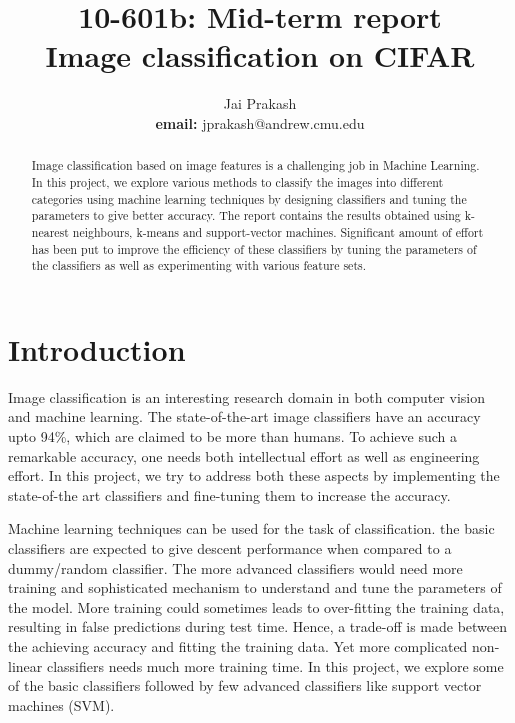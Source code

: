 \documentclass{article} %
\author{Jai Prakash \\ \textbf{email:} jprakash@andrew.cmu.edu}
\title{10-601b: Mid-term report\\Image classification on CIFAR
}
\begin{document}
\maketitle

\begin{abstract}
Image classification based on image features is a challenging job in Machine Learning. In this project, we explore various methods to classify the images into different categories using machine learning techniques by designing classifiers and tuning the parameters to give better accuracy. The report contains the results obtained using k-nearest neighbours, k-means and support-vector machines. Significant amount of effort has been put to improve the efficiency of these classifiers by tuning the parameters of the classifiers as well as experimenting with various feature sets. %
\end{abstract}

\section{Introduction}
Image classification is an interesting research domain in both computer vision and machine learning. The state-of-the-art image classifiers have an accuracy upto 94\%, which are claimed to be more than humans. To achieve such a remarkable accuracy, one needs both intellectual effort as well as engineering effort. In this project, we try to address both these aspects by implementing the state-of-the art classifiers and fine-tuning them to increase the accuracy.

Machine learning techniques can be used for the task of classification. the basic classifiers are expected to give descent performance when compared to a dummy/random classifier. The more advanced classifiers would need more training and sophisticated mechanism to understand and tune the parameters of the model. More training could sometimes leads to over-fitting the training data, resulting in false predictions during test time. Hence, a trade-off is made between the achieving accuracy and fitting the training data. Yet more complicated non-linear classifiers needs much more training time. In this project, we explore some of the basic classifiers followed by few advanced classifiers like support vector machines (SVM).
\end{document}

